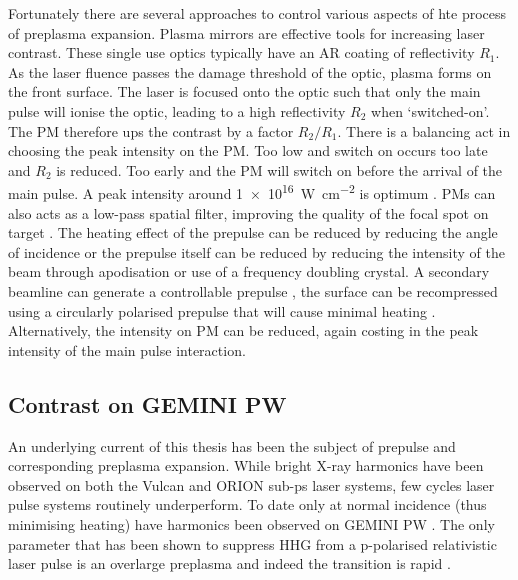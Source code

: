 Fortunately there are several approaches to control various aspects of hte process of preplasma expansion. Plasma mirrors are effective tools for increasing laser contrast. These single use optics typically have an \ac{AR} coating of reflectivity $R_1$. As the laser fluence passes the damage threshold of the optic, plasma forms on the front surface. The laser is focused onto the optic such that only the main pulse will ionise the optic, leading to a high reflectivity $R_2$ when `switched-on'. The \ac{PM} therefore ups the contrast by a factor $R_2/R_1$. There is a balancing act in choosing the peak intensity on the \ac{PM}. Too low and switch on occurs too late and $R_2$ is reduced. Too early and the PM will switch on before the arrival of the main pulse. A peak intensity around \qty{1e16}{W.cm^{-2}} is optimum \cite{caiTimeresolvedMeasurementsReflectivity2009}. PMs can also acts as a low-pass spatial filter, improving the quality of the focal spot on target \cite{doumyCompleteCharacterizationPlasma2004}. The heating effect of the prepulse can be reduced by reducing the angle of incidence or the prepulse itself can be reduced by reducing the intensity of the beam through apodisation or use of a frequency doubling crystal. A secondary beamline can generate a controllable prepulse \cite{kahalyDirectObservationDensityGradient2013}, the surface can be recompressed using a circularly polarised prepulse that will cause minimal heating \cite{liExperimentalDemonstrationEfficient2022}. Alternatively, the intensity on PM can be reduced, again costing in the peak intensity of the main pulse interaction.




\subsection{Contrast on GEMINI PW}

An underlying current of this thesis has been the subject of prepulse and corresponding preplasma expansion. While bright X-ray harmonics have been observed on both the Vulcan \cite{dromeyBrightMultikeVHarmonic2007} and ORION sub-ps laser systems, few cycles laser pulse systems routinely underperform. To date only at normal incidence (thus minimising heating) have harmonics been observed on GEMINI PW \cite{dromeyCoherentSynchrotronEmission2013}. The only parameter that has been shown to suppress HHG from a p-polarised relativistic laser pulse is an overlarge preplasma \cite{dollarScalingHighorderHarmonic2013} and indeed the transition is rapid \cite{kahalyDirectObservationDensityGradient2013}.

